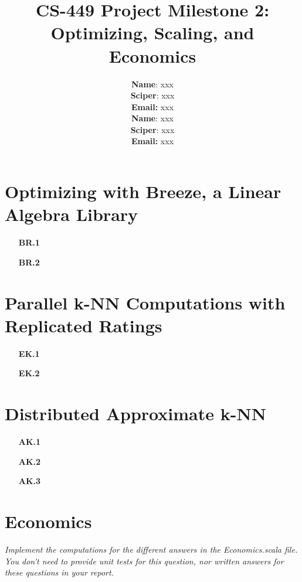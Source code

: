 \documentclass{article}
\title{CS-449 Project Milestone 2: Optimizing, Scaling, and Economics}
\author{
\textbf{Name}: xxx\\
\textbf{Sciper}: xxx\\
\textbf{Email:} xxx\\
\textbf{Name}: xxx\\
\textbf{Sciper}: xxx\\
\textbf{Email:} xxx\\
}
\begin{document}
\maketitle

\section{Optimizing with Breeze, a Linear Algebra Library}
\label{section:optimization}

\begin{itemize}
    \item[\textbf{BR.1}] \BROne

    \item [\textbf{BR.2}] \BRTwoOne

                        \BRTwoTwo

                        \BRTwoThree
\end{itemize}


\section{Parallel k-NN Computations with Replicated Ratings}

 \begin{enumerate}
  \item [\textbf{EK.1}]  \EKOne
  
  \item [\textbf{EK.2}]  \EKTwo
\end{enumerate}

\section{Distributed Approximate k-NN}
\begin{enumerate}
    \item [\textbf{AK.1}] \AKOne
    \item [\textbf{AK.2}] \AKTwo
    \item [\textbf{AK.3}] \AKThree
\end{enumerate}

\section{Economics}

\textit{Implement the computations for the different answers in the Economics.scala file. You don't need to provide unit tests for this question, nor written answers for these questions in your report.}
\end{document}

